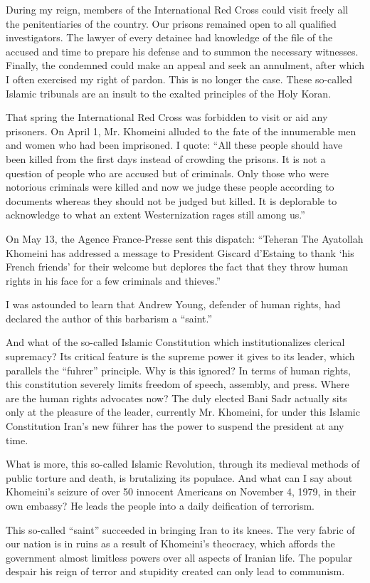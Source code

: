 During my reign, members of the International Red Cross could visit freely all the penitentiaries of the country. Our prisons remained open to all qualified investigators. The lawyer of every detainee had knowledge of the file of the accused and time to prepare his defense and to summon the necessary witnesses. Finally, the condemned could make an appeal and seek an annulment, after which I often exercised my right of pardon. This is no longer the case. These so-called Islamic tribunals are an insult to the exalted principles of the Holy Koran. 

That spring the International Red Cross was forbidden to visit or aid any prisoners. On April 1, Mr. Khomeini alluded to the fate of the innumerable men and women who had been imprisoned. I quote: “All these people should have been killed from the first days instead of crowding the prisons. It is not a question of people who are accused but of criminals. Only those who were notorious criminals were killed and now we judge these people according to documents whereas they should not be judged but killed. It is deplorable to acknowledge to what an extent Westernization rages still among us.” 

On May 13, the Agence France-Presse sent this dispatch: “Teheran The Ayatollah Khomeini has addressed a message to President Giscard d'Estaing to thank ‘his French friends’ for their welcome but deplores the fact that they throw human rights in his face for a few criminals and thieves.” 

I was astounded to learn that Andrew Young, defender of human rights, had declared the author of this barbarism a “saint.” 

And what of the so-called Islamic Constitution which institutionalizes clerical supremacy? Its critical feature is the supreme power it gives to its leader, which parallels the “fuhrer” principle. Why is this ignored? In terms of human rights, this constitution severely limits freedom of speech, assembly, and press. Where are the human rights advocates now? The duly elected Bani Sadr actually sits only at the pleasure of the leader, currently Mr. Khomeini, for under this Islamic Constitution Iran's new führer has the power to suspend the president at any time. 

What is more, this so-called Islamic Revolution, through its medieval methods of public torture and death, is brutalizing its populace. And what can I say about Khomeini's seizure of over 50 innocent Americans on November 4, 1979, in their own embassy? He leads the people into a daily deification of terrorism. 

This so-called “saint” succeeded in bringing Iran to its knees. The very fabric of our nation is in ruins as a result of Khomeini's theocracy, which affords the government almost limitless powers over all aspects of Iranian life. The popular despair his reign of terror and stupidity created can only lead to communism. 

